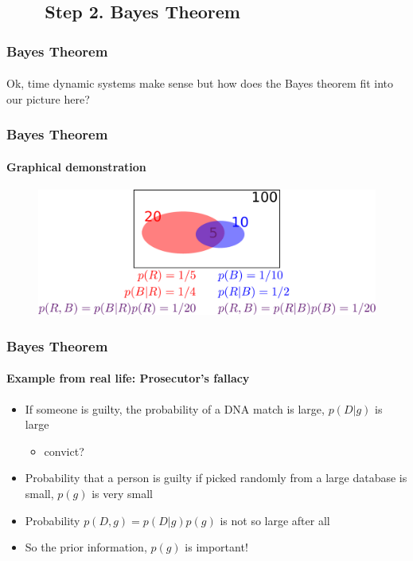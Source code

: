 \subsection{\ \ \ \ Step 2. Bayes Theorem}
\begin{frame}
\frametitle{Bayes Theorem}
\framesubtitle{}
\mypagenum
Ok, time dynamic systems make sense but how does the Bayes theorem fit into our picture here?
\end{frame}



\begin{frame}
\frametitle{Bayes Theorem}
\framesubtitle{Graphical demonstration}
\mypagenum
\begin{changemargin}{-1.3in}{0in}
\begin{figure}
\includegraphics[width=1.35\textwidth]{figs/PRML_Bayes.pdf}
\end{figure}
\end{changemargin}
\end{frame}



\begin{frame}
\frametitle{Bayes Theorem}
\framesubtitle{Example from real life: Prosecutor's fallacy}
\mypagenum
\begin{itemize}
\item If someone is guilty, the probability of a DNA match is large, $p(D|g)$ is large
\begin{itemize}
\item convict?
\end{itemize}
\item Probability that a person is guilty if picked randomly from a large database is small, $p(g)$ is very small
\item Probability $p(D,g)=p(D|g)p(g)$ is not so large after all
\item So the prior information, $p(g)$ is important!
\end{itemize}
\end{frame}


